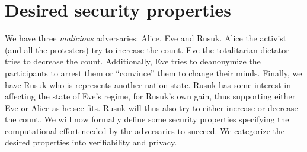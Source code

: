 \mode*
\section{Desired security properties}%
\label{Properties}


We have three \emph{malicious} adversaries: Alice, Eve and Rusuk.
Alice the activist (and all the protesters) try to increase the count.
Eve the totalitarian dictator tries to decrease the count.
Additionally, Eve tries to deanonymize the participants to arrest them or 
\enquote{convince} them to change their minds.
Finally, we have Rusuk who is represents another nation state.
Rusuk has some interest in affecting the state of Eve's regime, for Rusuk's own 
gain, thus supporting either Eve or Alice as he see fits.
Rusuk will thus also try to either increase or decrease the count.
We will now formally define some security properties specifying the 
computational effort needed by the adversaries to succeed.
We categorize the desired properties into verifiability and privacy.


